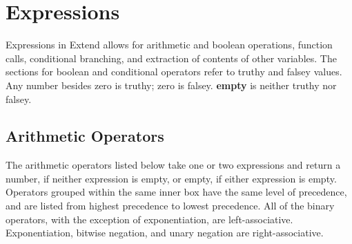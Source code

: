\section{Expressions}
	Expressions in Extend allows for arithmetic and boolean operations, function calls, conditional branching, and extraction of contents of other variables. The sections for boolean and conditional operators refer to truthy and falsey values. Any number besides zero is truthy; zero is falsey. \textbf{empty} is neither truthy nor falsey. 
		\subsection{Arithmetic Operators} 
			The arithmetic operators listed below take one or two expressions and return a number, if neither expression is empty, or empty, if either expression is empty. Operators grouped within the same inner box have the same level of precedence, and are listed from highest precedence to lowest precedence. All of the binary operators, with the exception of exponentiation, are left-associative. Exponentiation, bitwise negation, and unary negation are right-associative.
